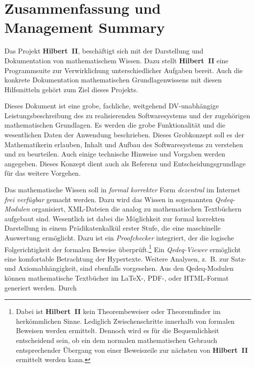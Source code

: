\documentclass[a4paper,german,10pt,twoside]{book}
\begin{document}
\chapter*{Zusammenfassung und Management Summary}
 Das Projekt
\textbf{Hilbert~II}, besch{\"a}ftigt sich mit der Darstellung und Dokumentation von mathematischem
Wissen. Dazu stellt \textbf{Hilbert~II} eine Programmsuite zur Verwirklichung unterschiedlicher
Aufgaben bereit. Auch die konkrete Dokumentation mathematischen Grundlagenwissens mit diesen
Hilfsmitteln geh{\"o}rt zum Ziel dieses Projekts.
\par
Dieses Dokument ist eine grobe, fachliche, weitgehend DV-unabh{\"a}ngige Leistungsbeschreibung des zu
realisierenden Softwaresystems und der zugeh{\"o}rigen mathematischen Grundlagen. Es werden die grobe
Funktionalit{\"a}t und die wesentlichen Daten der Anwendung beschrieben. Dieses Grobkonzept soll es der
Mathematikerin erlauben, Inhalt und Aufbau des Softwaresystems zu verstehen und zu beurteilen. Auch
einige technische Hinweise und Vorgaben werden angegeben. Dieses Konzept dient auch als Referenz
und Entscheidungsgrundlage f{\"u}r das weitere Vorgehen.
\par
Das mathematische Wissen soll in \emph{formal korrekter} Form \emph{dezentral} im Internet
\emph{frei verf{\"u}gbar} gemacht werden. Dazu wird das Wissen in sogenannten \emph{Qedeq-Modulen}
organisiert, XML-Dateien die analog zu mathematischen Textb{\"u}chern aufgebaut sind. Wesentlich ist
dabei die M{\"o}glichkeit zur formal korrekten Darstellung in einem Pr{\"a}dikatenkalk{\"u}l erster Stufe, die
eine maschinelle Auswertung erm{\"o}glicht. Dazu ist ein \emph{Proofchecker}
integriert, der die logische Folgerichtigkeit der formalen Beweise {\"u}berpr{\"u}ft.\footnote{Dabei ist
\textbf{Hilbert~II} kein Theorembeweiser oder Theoremfinder im herk{\"o}mmlichen
Sinne. Lediglich Zwischenschritte innerhalb von formalen Beweisen werden ermittelt. Dennoch wird es
f{\"u}r die Bequemlichkeit entscheidend sein, ob ein dem {\glqq normalen mathematischen Gebrauch\grqq}
entsprechender {\"U}bergang von einer Beweiszeile zur n{\"a}chsten von \textbf{Hilbert~II} ermittelt werden
kann.} Ein \emph{Qedeq-Viewer} erm{\"o}glicht eine komfortable Betrachtung der Hypertexte. Weitere
Analysen, z.~B. zur Satz- und Axiomabh{\"a}ngigkeit, sind ebenfalls vorgesehen. Aus den Qedeq-Modulen
k{\"o}nnen mathematische Textb{\"u}cher im \LaTeX-, \mbox{PDF-,} oder HTML-Format generiert werden. Durch
\end{document}
